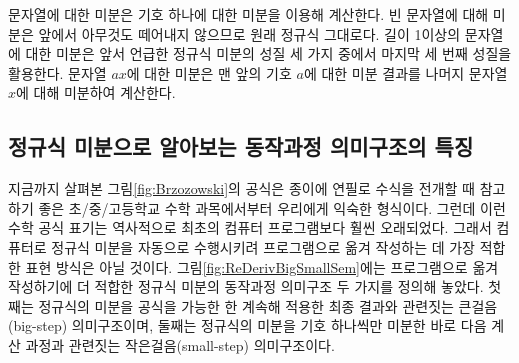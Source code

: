 문자열에 대한 미분은 기호 하나에 대한 미분을 이용해 계산한다.
빈 문자열에 대해 미분은 앞에서 아무것도 떼어내지 않으므로
원래 정규식 그대로다. 길이 1이상의 문자열에 대한 미분은 앞서 언급한
정규식 미분의 성질 세 가지 중에서 마지막 세 번째 성질을 활용한다.
문자열 $ax$에 대한 미분은 맨 앞의 기호 $a$에 대한 미분 결과를
나머지 문자열 $x$에 대해 미분하여 계산한다.

\subsection{정규식 미분으로 알아보는 동작과정 의미구조의 특징}
지금까지 살펴본 그림\;\ref{fig:Brzozowski}의 공식은
종이에 연필로 수식을 전개할 때 참고하기 좋은 초/중/고등학교
수학 과목에서부터 우리에게 익숙한 형식이다. 그런데 이런 수학 공식 표기는
역사적으로 최초의 컴퓨터 프로그램\cite{Lovelace1843notes}보다 훨씬
오래되었다. 그래서 컴퓨터로 정규식 미분을 자동으로 수행시키려
프로그램으로 옮겨 작성하는 데 가장 적합한 표현 방식은 아닐 것이다.
그림\;\ref{fig:ReDerivBigSmallSem}에는 프로그램으로 옮겨 작성하기에
더 적합한 정규식 미분의 동작과정 의미구조 두 가지를 정의해 놓았다.
첫째는 정규식의 미분을 공식을 가능한 한 계속해 적용한 최종 결과와
관련짓는 큰걸음(big-step) 의미구조이며, 둘째는 정규식의 미분을 기호
하나씩만 미분한 바로 다음 계산 과정과 관련짓는 작은걸음(small-step)
의미구조이다.

